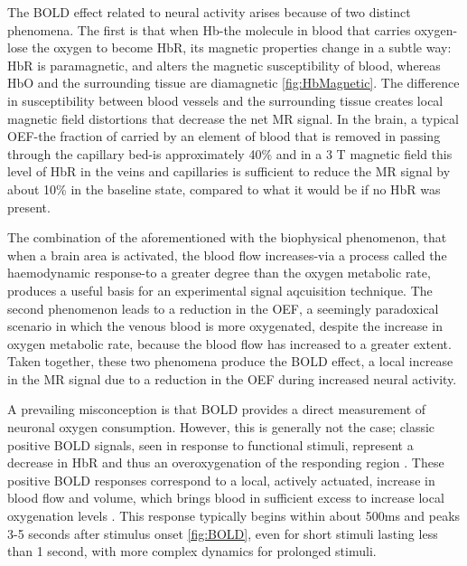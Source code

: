 The \gls{BOLD} effect related to neural activity arises because of two distinct phenomena. The first is that when \gls{Hb}-the molecule in blood that carries oxygen-lose the oxygen to become \gls{HbR}, its magnetic properties change in a subtle way: \gls{HbR} is paramagnetic, and alters the magnetic susceptibility of blood, whereas \gls{HbO} and the surrounding tissue  are diamagnetic \autoref{fig:HbMagnetic}. The difference in susceptibility between blood vessels and the surrounding tissue creates local magnetic field distortions that decrease the net \gls{MR} signal. In the brain, a typical \gls{OEF}-the fraction of  carried by an element of blood that is removed in passing through the capillary bed-is approximately 40\% and in a 3 T magnetic field this level of \gls{HbR} in the veins and capillaries is sufficient to reduce the \gls{MR} signal by about 10\% in the baseline state, compared to what it would be if no \gls{HbR} was present. 

The combination of the aforementioned with the biophysical phenomenon, that when a brain area is activated, the blood flow increases-via a process called the haemodynamic response-to a greater degree than the oxygen metabolic rate, produces a useful basis for an experimental signal aqcuisition technique. The second phenomenon leads to a reduction in the \gls{OEF}, a seemingly paradoxical scenario in which the venous blood is more oxygenated, despite the increase in oxygen metabolic rate, because the blood flow has increased to a greater extent. Taken together, these two phenomena produce the \gls{BOLD} effect, a local increase in the \gls{MR} signal due to a reduction in the \gls{OEF} during increased neural activity. \cite{Buxton2013}

A prevailing misconception is that \gls{BOLD} provides a direct measurement of neuronal oxygen consumption. However, this is generally not the case; classic positive \gls{BOLD} signals, seen in response to functional stimuli, represent a decrease in \gls{HbR} and thus an overoxygenation of the responding region \cite{Attwell2002}. These positive \gls{BOLD} responses correspond to a local, actively actuated, increase in blood flow and volume, which brings blood in sufficient excess to increase local oxygenation levels \cite{Raichle1998}. This response typically begins within about 500ms and peaks 3-5 seconds after stimulus onset \autoref{fig:BOLD}, even for short stimuli lasting less than 1 second, with more complex dynamics for prolonged stimuli.

